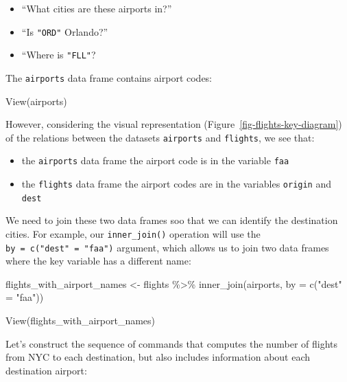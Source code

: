 \documentclass[
  letterpaper,
  DIV=11,
  numbers=noendperiod]{scrreprt}
\newenvironment{Shaded}{\begin{snugshade}}{\end{snugshade}}
\newcommand{\AttributeTok}[1]{\textcolor[rgb]{0.40,0.45,0.13}{#1}}
\newcommand{\FunctionTok}[1]{\textcolor[rgb]{0.28,0.35,0.67}{#1}}
\newcommand{\NormalTok}[1]{\textcolor[rgb]{0.00,0.23,0.31}{#1}}
\newcommand{\OtherTok}[1]{\textcolor[rgb]{0.00,0.23,0.31}{#1}}
\newcommand{\SpecialCharTok}[1]{\textcolor[rgb]{0.37,0.37,0.37}{#1}}
\newcommand{\StringTok}[1]{\textcolor[rgb]{0.13,0.47,0.30}{#1}}
\providecommand{\tightlist}{%
  \setlength{\itemsep}{0pt}\setlength{\parskip}{0pt}}\usepackage{longtable,booktabs,array}
\theoremstyle{definition}
\theoremstyle{remark}
\begin{document}
\begin{itemize}
\tightlist
\item
  ``What cities are these airports in?''
\item
  ``Is \texttt{"ORD"} Orlando?''
\item
  ``Where is \texttt{"FLL"}?
\end{itemize}

The \texttt{airports} data frame contains airport codes:

\begin{Shaded}
\begin{Highlighting}[]
\FunctionTok{View}\NormalTok{(airports)}
\end{Highlighting}
\end{Shaded}

However, considering the visual representation
(Figure~\ref{fig-flights-key-diagram}) of the relations between the
datasets \texttt{airports} and \texttt{flights}, we see that:

\begin{itemize}
\tightlist
\item
  the \texttt{airports} data frame the airport code is in the variable
  \texttt{faa}
\item
  the \texttt{flights} data frame the airport codes are in the variables
  \texttt{origin} and \texttt{dest}
\end{itemize}

We need to join these two data frames soo that we can identify the
destination cities. For example, our \texttt{inner\_join()} operation
will use the \texttt{by\ =\ c("dest"\ =\ "faa")} argument, which allows
us to join two data frames where the key variable has a different name:

\begin{Shaded}
\begin{Highlighting}[]
\NormalTok{flights\_with\_airport\_names }\OtherTok{\textless{}{-}}\NormalTok{  flights }\SpecialCharTok{\%\textgreater{}\%} 
  \FunctionTok{inner\_join}\NormalTok{(airports, }\AttributeTok{by =} \FunctionTok{c}\NormalTok{(}\StringTok{"dest"} \OtherTok{=} \StringTok{"faa"}\NormalTok{))}

\FunctionTok{View}\NormalTok{(flights\_with\_airport\_names)}
\end{Highlighting}
\end{Shaded}

Let's construct the sequence of commands that computes the number of
flights from NYC to each destination, but also includes information
about each destination airport:
\end{document}
